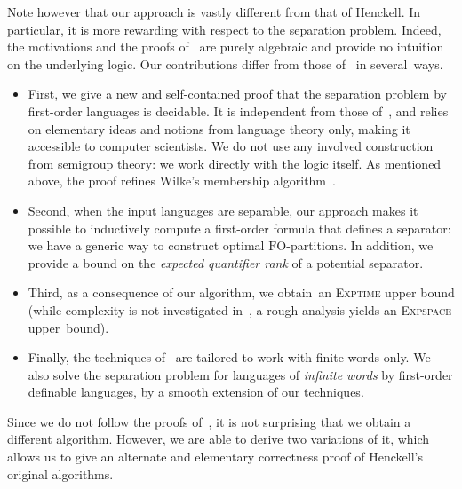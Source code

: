 \documentclass{CSML}
\newcommand{\fo}{\ensuremath{\text{FO}}\xspace}
\theoremstyle{plain}
\begin{document}
Note however that our approach is vastly different from that of
Henckell. In particular, it is more rewarding with respect to the
separation problem. Indeed, the motivations and the proofs
of~\cite{Henckell:Pointlike-sets:-finest-aperiodic:1988:a,DBLP:journals/ijac/HenckellRS10a}
are purely algebraic and provide no intuition on the underlying logic.
Our contributions differ from those of~\cite{Henckell:Pointlike-sets:-finest-aperiodic:1988:a,DBLP:journals/ijac/HenckellRS10a}
in several~ways.
\begin{itemize}[leftmargin=*]
\item First, we give a new and self-contained proof that the separation
  problem by first-order languages is decidable. It is independent from those
  of~\cite{Henckell:Pointlike-sets:-finest-aperiodic:1988:a,DBLP:journals/ijac/HenckellRS10a},
  and relies on elementary ideas and notions from language theory only, making
  it accessible to computer scientists. We do not use any involved
  construction from semigroup theory: we work directly with the logic
  itself.   As mentioned above, the proof refines Wilke's membership algorithm~\cite{wfo}.

\item Second, when the input languages are separable, our approach makes it
  possible to inductively compute a first-order formula that defines a
  separator: we have a generic way to construct optimal \fo-partitions.
  In addition, we provide a bound on the \emph{expected quantifier rank} of a
  potential separator.

\item Third, as a consequence of our algorithm, we obtain~an \textsc{Exptime}
  upper bound (while complexity is not investigated
  in~\cite{Henckell:Pointlike-sets:-finest-aperiodic:1988:a}, a rough analysis
  yields an \textsc{Expspace} upper~bound).

\item Finally, the techniques
  of~\cite{Henckell:Pointlike-sets:-finest-aperiodic:1988:a,DBLP:journals/ijac/HenckellRS10a}
  are tailored to work with finite words only. We also solve the
  separation problem for languages of \emph{infinite words} by
  first-order definable languages, by a smooth extension of our
  techniques.
\end{itemize}
Since we do not follow the proofs
of~\cite{Henckell:Pointlike-sets:-finest-aperiodic:1988:a,DBLP:journals/ijac/HenckellRS10a},
it is not surprising that we obtain a different algorithm. However, we are
able to derive two variations of it, which allows us to give an alternate
and elementary correctness proof of Henckell's original algorithms.
\end{document}
